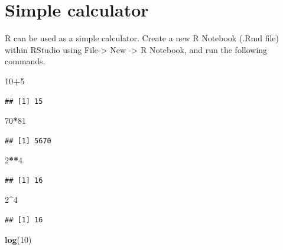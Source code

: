 \documentclass[]{book}
\newenvironment{Shaded}{\begin{snugshade}}{\end{snugshade}}
\newcommand{\DecValTok}[1]{\textcolor[rgb]{0.00,0.00,0.81}{#1}}
\newcommand{\KeywordTok}[1]{\textcolor[rgb]{0.13,0.29,0.53}{\textbf{#1}}}
\newcommand{\NormalTok}[1]{#1}
\newcommand{\OperatorTok}[1]{\textcolor[rgb]{0.81,0.36,0.00}{\textbf{#1}}}
\theoremstyle{definition}
\theoremstyle{definition}
\theoremstyle{definition}
\theoremstyle{remark}
\begin{document}
\hypertarget{simple-calculator}{%
\section{Simple calculator}\label{simple-calculator}}

R can be used as a simple calculator.
Create a new R Notebook (.Rmd file) within RStudio using File-\textgreater{} New -\textgreater{} R Notebook, and run the following commands.

\begin{Shaded}
\begin{Highlighting}[]
\DecValTok{10}\OperatorTok{+}\DecValTok{5} 
\end{Highlighting}
\end{Shaded}

\begin{verbatim}
## [1] 15
\end{verbatim}

\begin{Shaded}
\begin{Highlighting}[]
\DecValTok{70}\OperatorTok{*}\DecValTok{81}
\end{Highlighting}
\end{Shaded}

\begin{verbatim}
## [1] 5670
\end{verbatim}

\begin{Shaded}
\begin{Highlighting}[]
\DecValTok{2}\OperatorTok{**}\DecValTok{4}
\end{Highlighting}
\end{Shaded}

\begin{verbatim}
## [1] 16
\end{verbatim}

\begin{Shaded}
\begin{Highlighting}[]
\DecValTok{2}\OperatorTok{^}\DecValTok{4}
\end{Highlighting}
\end{Shaded}

\begin{verbatim}
## [1] 16
\end{verbatim}

\begin{Shaded}
\begin{Highlighting}[]
\KeywordTok{log}\NormalTok{(}\DecValTok{10}\NormalTok{)                         }
\end{Highlighting}
\end{Shaded}
\end{document}
